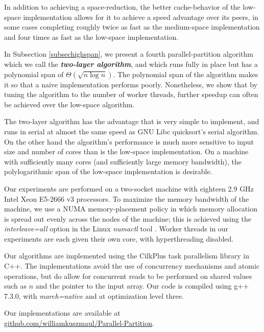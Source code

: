 \documentclass[sigconf]{acmart}
\newcommand{\github}{\url{github.com/williamkuszmaul/Parallel-Partition}}
\newcommand{\defn}[1]       {{\textit{\textbf{\boldmath #1}}}}
\renewcommand{\paragraph}[1]{\vspace{0.09in}\noindent{\bf \boldmath #1.}}
\theoremstyle{remark}
\theoremstyle{remark}
\begin{document}
In addition to achieving a space-reduction, the better cache-behavior
of the low-space implementation allows for it to achieve a speed
advantage over its peers, in some cases completing roughly twice as
fast as the medium-space implementation and four times as fast as the
low-space implementation.

In Subsection \ref{subsechighspan}, we present a fourth
parallel-partition algorithm which we call the \defn{two-layer
  algorithm}, and which runs fully in place but has a polynomial span
of $\Theta(\sqrt{n \log n})$. The polynomial span of the algorithm
makes it so that a naive implementation performs poorly. Nonetheless,
we show that by tuning the algorithm to the number of worker threads,
further speedup can often be achieved over the low-space algorithm.

The two-layer algorithm has the advantage that is very simple to
implement, and runs in serial at almost the same speed as GNU Libc
quicksort's serial algorithm. On the other hand the algorithm's
performance is much more sensitive to input size and number of cores
than is the low-space implementation. On a machine with sufficiently
many cores (and sufficiently large memory bandwidth), the
polylogarithmic span of the low-space implementation is desirable.


\paragraph{Machine Details}
Our experiments are performed on a two-socket machine with eighteen
2.9 GHz Intel Xeon E5-2666 v3 processors. To maximize the memory
bandwidth of the machine, we use a NUMA memory-placement policy in
which memory allocation is spread out evenly across the nodes of the
machine; this is achieved using the \emph{interleave=all} option in
the Linux \emph{numactl} tool \cite{Kleen05}. Worker threads in our
experiments are each given their own core, with hyperthreading
disabled.

Our algorithms are implemented using the CilkPlus task parallelism
library in C++. The implementations avoid the use of concurrency
mechanisms and atomic operations, but do allow for concurrent reads to
be performed on shared values such as $n$ and the pointer to the input
array. Our code is compiled using g++ 7.3.0, with \emph{march=native}
and at optimization level three. 

Our implementations are available at \\ \github.
\end{document}
